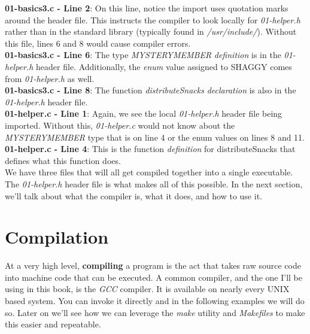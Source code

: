 \documentclass[../main.tex]{subfiles}
\begin{document}


\textbf{01-basics3.c - Line 2}: On this line, notice the import uses quotation marks around the header file.  This instructs the compiler to look locally for \textit{01-helper.h} rather than in the standard library (typically found in \textit{/usr/include/}).  Without this file, lines 6 and 8 would cause compiler errors.\\
\textbf{01-basics3.c - Line 6}: The type \textit{MYSTERYMEMBER} \textit{definition} is in the \textit{01-helper.h} header file.  Additionally, the \textit{enum} value assigned to SHAGGY comes from \textit{01-helper.h} as well.\\
\textbf{01-basics3.c - Line 8}: The function \textit{distributeSnacks} \textit{declaration} is also in the \textit{01-helper.h} header file.\\



\textbf{01-helper.c - Line 1}:  Again, we see the local \textit{01-helper.h} header file being imported.  Without this, \textit{01-helper.c} would not know about the \textit{MYSTERYMEMBER} type that is on line 4  or the enum values on lines 8 and 11.\\
\textbf{01-helper.c - Line 4}:  This is the function \textit{definition} for distributeSnacks that defines what this function does.\\

We have three files that will all get compiled together into a single executable.  The \textit{01-helper.h} header file is what makes all of this possible.  In the next section, we'll talk about what the compiler is, what it does, and how to use it.


\section{Compilation}

At a very high level, \textbf{compiling} a program is the act that takes raw source code into machine code that can be executed.  A common compiler, and the one I'll be using in this book, is the \textit{GCC} compiler.  It is available on nearly every UNIX based system.  You can invoke it directly and in the following examples we will do so.  Later on we'll see how we can leverage the \textit{make} utility and \textit{Makefiles} to make this easier and repeatable.
\end{document}
